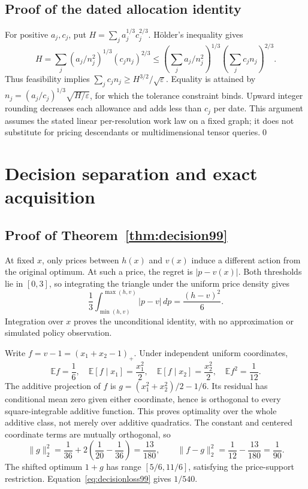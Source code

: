 \subsection{Proof of the dated allocation identity}
For positive $a_j,c_j$, put $H=\sum_j a_j^{1/3}c_j^{2/3}$. H\"older's inequality gives
\[
 H=\sum_j(a_j/n_j^2)^{1/3}(c_jn_j)^{2/3}
 \le\left(\sum_j a_j/n_j^2\right)^{1/3}
       \left(\sum_j c_jn_j\right)^{2/3}.
\]
Thus feasibility implies $\sum_jc_jn_j\ge H^{3/2}/\sqrt\varepsilon$. Equality is attained by
$n_j=(a_j/c_j)^{1/3}\sqrt{H/\varepsilon}$, for which the tolerance constraint binds. Upward integer rounding decreases each allowance and adds less than $c_j$ per date. This argument assumes the stated linear per-resolution work law on a fixed graph; it does not substitute for pricing descendants or multidimensional tensor queries.\qed

\section{Decision separation and exact acquisition}\label{supp:decision99}
\subsection{Proof of Theorem~\ref{thm:decision99}}
At fixed $x$, only prices between $h(x)$ and $v(x)$ induce a different action from the original optimum. At such a price, the regret is $|p-v(x)|$. Both thresholds lie in $[0,3]$, so integrating the triangle under the uniform price density gives
\[
 \frac13\int_{\min(h,v)}^{\max(h,v)}|p-v|\,dp
 =\frac{(h-v)^2}{6}.
\]
Integration over $x$ proves the unconditional identity, with no approximation or simulated policy observation.

Write $f=v-1=(x_1+x_2-1)_+$. Under independent uniform coordinates,
\[
 \mathbb Ef=\frac16,\quad
 \mathbb E[f\mid x_1]=\frac{x_1^2}{2},\quad
 \mathbb E[f\mid x_2]=\frac{x_2^2}{2},\quad
 \mathbb Ef^2=\frac1{12}.
\]
The additive projection of $f$ is $g=(x_1^2+x_2^2)/2-1/6$. Its residual has conditional mean zero given either coordinate, hence is orthogonal to every square-integrable additive function. This proves optimality over the whole additive class, not merely over additive quadratics. The constant and centered coordinate terms are mutually orthogonal, so
\[
 \|g\|_2^2=\frac1{36}+2\left(\frac1{20}-\frac1{36}\right)=\frac{13}{180},
 \qquad \|f-g\|_2^2=\frac1{12}-\frac{13}{180}=\frac1{90}.
\]
The shifted optimum $1+g$ has range $[5/6,11/6]$, satisfying the price-support restriction. Equation~\eqref{eq:decisionloss99} gives $1/540$.


